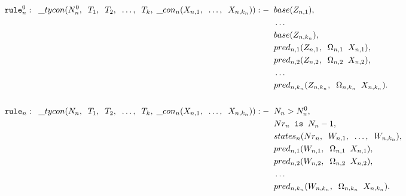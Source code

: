 	\begin{align*}
		\texttt{rule}_{n}^{0}: \;\; \_ tycon (N_{n}^{0}, \;\; T_1, \;\; T_2, \;\; \ldots, \;\; T_k, \; \_ con_n(X_{n,1}, \;\; \ldots, \;\; X_{n,k_n})) :-
		  & \;\; base(Z_{n,1}),                                                 &   &   \\
		  & \;\; \ldots                                                         &   &   \\
		  & \;\; base(Z_{n,k_n}),                                               &   &   \\
		  & \;\; pred_{n, 1}(Z_{n,1}, \;\; \Omega_{n, 1} \;\; X_{n,1}),         &   &   \\
		  & \;\; pred_{n, 2}(Z_{n,2}, \;\; \Omega_{n, 2} \;\; X_{n,2}),         &   &   \\
		  & \;\; \ldots \;\;                                                    &   &   \\
		  & \;\; pred_{n, k_n}(Z_{n,k_n}, \;\; \Omega_{n, k_n} \;\; X_{n,k_n}). &   &   \\
		\\
		\texttt{rule}_n: \;\; \_ tycon (N_n, \;\; T_1, \;\; T_2, \;\; \ldots, \;\; T_k, \; \_ con_n(X_{n,1}, \;\; \ldots, \;\; X_{n,k_n})) :-
		  & \;\; N_n > N_{n}^{0},                                               &   &   \\
		  & \;\; Nr_n \;\; \texttt{is} \;\; N_n - 1,                               &   &   \\
		  & \;\; states_n(Nr_n, \;\; W_{n,1}, \;\; \ldots, \;\; W_{n,k_n}),     &   &   \\
		  & \;\; pred_{n, 1}(W_{n,1}, \;\; \Omega_{n, 1} \;\; X_{n,1}),         &   &   \\
		  & \;\; pred_{n, 2}(W_{n,2}, \;\; \Omega_{n, 2} \;\; X_{n,2}),         &   &   \\
		  & \;\; \ldots \;\;                                                    &   &   \\
		  & \;\; pred_{n, k_n}(W_{n,k_n}, \;\; \Omega_{n, k_n} \;\; X_{n,k_n}). &   &   \\
	\end{align*}\\
